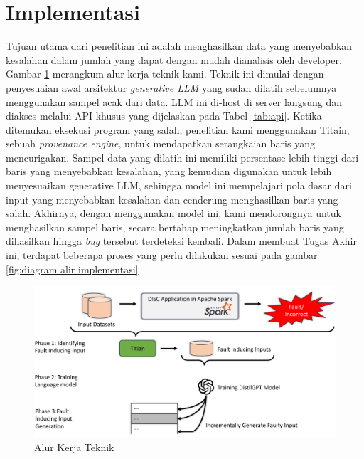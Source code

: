 \section{Implementasi}
\label{sec:implementasi}
Tujuan utama dari penelitian ini adalah menghasilkan data 
yang menyebabkan kesalahan dalam jumlah yang dapat dengan 
mudah dianalisis oleh developer. 
Gambar \ref{fig:alur kerja teknik} merangkum alur 
kerja teknik kami. Teknik ini dimulai 
dengan penyesuaian awal arsitektur \emph{generative LLM} yang 
sudah dilatih sebelumnya menggunakan sampel acak dari data. 
LLM ini di-host di server langsung dan diakses melalui API 
khusus yang dijelaskan pada Tabel \ref{tab:api}.
Ketika ditemukan eksekusi program yang salah, 
penelitian kami menggunakan Titain, sebuah 
\emph{provenance engine}, untuk mendapatkan serangkaian baris yang 
mencurigakan. Sampel data yang dilatih ini  memiliki 
persentase lebih tinggi dari baris yang menyebabkan kesalahan, 
yang kemudian digunakan untuk lebih menyesuaikan generative 
LLM, sehingga model ini mempelajari pola dasar dari input yang 
menyebabkan kesalahan dan cenderung menghasilkan baris 
yang salah. Akhirnya, dengan menggunakan model ini, 
kami mendorongnya untuk menghasilkan 
sampel baris, secara bertahap meningkatkan jumlah baris 
yang dihasilkan hingga \emph{bug} tersebut terdeteksi kembali.
Dalam membuat Tugas Akhir ini, terdapat beberapa proses 
yang perlu dilakukan sesuai pada gambar \ref{fig:diagram alir implementasi}

\begin{figure}[H]
  \centering
  \includegraphics[scale=0.25]{gambar/AlurKerjaTeknik.png}

  \caption{Alur Kerja Teknik}
  \label{fig:alur kerja teknik}
\end{figure}


